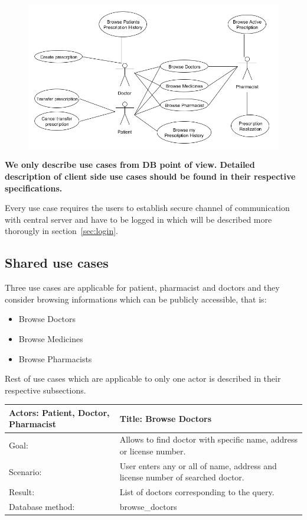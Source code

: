 \begin{figure}[h]
\centering
\includegraphics[width=1\textwidth]{database/standardUseCases.png}
\end{figure} 
\textbf{ We only describe use cases from DB point of view.
Detailed description of client side use cases should be found in their respective specifications.}

Every use case requires the users to establish secure channel of communication with central server and have to be logged in which will be described more thorougly in section~\ref{sec:login}.
\subsection{Shared use cases}

Three use cases are applicable for patient, pharmacist and doctors and they consider browsing informations which can be publicly accessible, that is:
\begin{itemize}
\item Browse Doctors
\item Browse Medicines 
\item Browse Pharmacists
\end{itemize}
Rest of use cases which are applicable to only one actor is described in their respective subsections.

\begin{table}[h]
    \begin{tabular}{| p{6cm} | p{7.75cm} |}
    \hline
    Actors: Patient, Doctor, Pharmacist &Title: Browse Doctors \\ \hline
    Goal: & Allows to find doctor with specific name, address or license number. \\ \hline
    Scenario: & User enters any or all of name, address and license number of searched doctor. \\ \hline
    Result: & List of doctors corresponding to the query. \\ \hline
    Database  method: & browse\_doctors \\ \hline
    \end{tabular}
\end{table}

